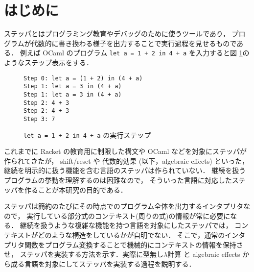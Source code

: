 \section{はじめに}
\label{sec:intro}

ステッパとはプログラミング教育やデバッグのために使うツールであり，
プログラムが代数的に書き換わる様子を出力することで実行過程を見せるものである．
例えば OCaml のプログラム
\texttt{let a = 1 + 2 in 4 + a}
を入力すると図 \ref{figure:step_example}のようなステップ表示をする．

\begin{figure}[h]
\texttt{Step 0:  let a = \colorbox[rgb]{0.8, 1.0, 0.8}{(1 + 2)} in (4 + a)\\
Step 1:  let a = \colorbox[rgb]{0.9, 0.7, 1.0}{3} in (4 + a)\\
Step 1:  \colorbox[rgb]{0.8, 1.0, 0.8}{let a = 3 in (4 + a)}\\
Step 2:  \colorbox[rgb]{0.9, 0.7, 1.0}{4 + 3}\\
Step 2:  \colorbox[rgb]{0.8, 1.0, 0.8}{4 + 3}\\
Step 3:  \colorbox[rgb]{0.9, 0.7, 1.0}{7}}
\caption{\texttt{let a = 1 + 2 in 4 + a} の実行ステップ}
\label{figure:step_example}
\end{figure}

これまでに Racket \cite{clements01} の教育用に制限した構文や
OCaml \cite{FCA19, EPTCS294.3} などを対象にステッパが作られてきたが，
shift/reset \cite{DF1990} や 代数的効果 \cite{PRETNAR201519}
(以下，algebraic effects) といった，
継続を明示的に扱う機能を含む言語のステッパは作られていない．
継続を扱うプログラムの挙動を理解するのは困難なので，
そういった言語に対応したステッパを作ることが本研究の目的である．

ステッパは簡約のたびにその時点でのプログラム全体を出力するインタプリタなので，
実行している部分式のコンテキスト(周りの式)の情報が常に必要になる．
継続を扱うような複雑な機能を持つ言語を対象にしたステッパでは，
コンテキストがどのような構造をしているかが自明でない．
そこで，通常のインタプリタ関数をプログラム変換することで機械的にコンテキストの情報を保持させ，
ステッパを実装する方法を示す．実際に型無し$\lambda$計算
と algebraic effects から成る言語を対象にしてステッパを実装する過程を説明する．

